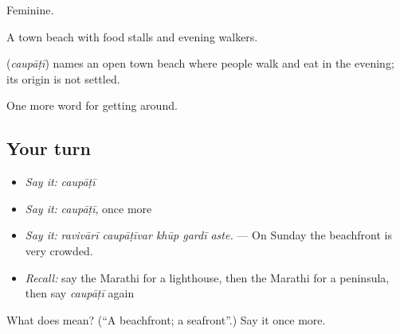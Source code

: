 Feminine.

A town beach with food stalls and evening walkers.

\begin{cousinweb}
\textbf{} (\emph{caupāṭī}) names an open town beach where people walk and eat in the evening; its origin is not settled.
\end{cousinweb}

\begin{grammarlens}[title={What you've built}]
One more word for getting around.
\end{grammarlens}

\subsection*{Your turn}
\begin{itemize}
\raggedright
  \item \emph{Say it:} \emph{caupāṭī}
  \item \emph{Say it:} \emph{caupāṭī}, once more
  \item \emph{Say it:} \emph{ravivārī caupāṭīvar khūp gardī aste.} — On Sunday the beachfront is very crowded.
  \item \emph{Recall:} say the Marathi for a lighthouse, then the Marathi for a peninsula, then say \emph{caupāṭī} again
\end{itemize}

\begin{tcolorbox}[breakable,colback=teal!4,colframe=teal!35!black,title={Before you move on}]
What does  mean? (\textquotedblleft{}A beachfront; a seafront\textquotedblright{}.) Say it once more.
\end{tcolorbox}
